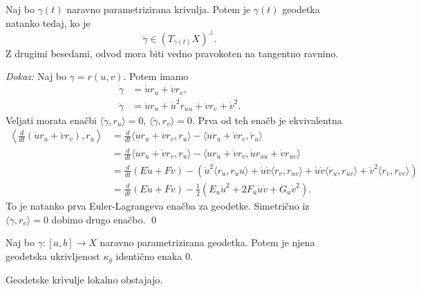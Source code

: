 \begin{izrek}
\label{izr_karakterizacija_geodetke_pri_naravni_parametrizaciji}
 Naj bo $\gamma(t)$ naravno parametrizirana krivulja. Potem je $\gamma(t)$ geodetka natanko tedaj, ko je \begin{equation*}
 \ddot{\gamma} \in (T_{\gamma(t)}X)^{\perp}.
 \end{equation*}  
Z drugimi besedami, odvod mora biti vedno pravokoten na tangentno ravnino.
\end{izrek}
\noindent
{\em Dokaz:\/}
Naj bo $\gamma = r(u,v)$. Potem imamo \begin{align*}
    \dot{\gamma} &= \dot{u} r_u + \dot{v} r_v ,\\
    \ddot{\gamma} &= \ddot{u} r_u + \dot{u}^2 r_{uu} + \ddot{v} r_v + \dot{v}^2.
\end{align*}
Veljati morata enačbi $\langle \ddot{\gamma}, r_u \rangle = 0$, $\langle \ddot{\gamma}, r_v \rangle  = 0$. Prva od teh enačb
je ekvivalentna \begin{align*}
    \left\langle \frac{d}{dt} (\dot{u} r_u + \dot{v} r_v), r_u \right\rangle  &= \frac{d}{dt}  \langle \dot{u} r_u + \dot{v} r_v, r_u \rangle - \langle \dot{u} r_u + \dot{v} r_v, \dot{r}_u \rangle \\
     &= \frac{d}{dt}  \langle \dot{u} r_u + \dot{v} r_v, r_u \rangle - \langle \dot{u} r_u + \dot{v} r_v, \dot{u} r_{uu} + \dot{v} r_{uv} \rangle \\
     &= \frac{d}{dt} (E \dot{u} + F\dot{v}) - (\dot{u}^2 \langle r_u, r_uu \rangle + \dot{u} \dot{v} \langle r_v, r_{uv} \rangle + \dot{u} \dot{v} \langle r_u, r_{uv} \rangle + \dot{v}^2 \langle r_v, r_{vv}  \rangle  ) \\
     &= \frac{d}{dt}   (E \dot{u} + F\dot{v}) - \frac{1}{2} (E_u \dot{u}^2 + 2 F_u \dot{u} \dot{v} + G_u \dot{v}^2).
    \end{align*}
To je natanko prva Euler-Lagrangeva enačba za geodetke. Simetrično iz $\langle \ddot{\gamma}, r_v \rangle  = 0$ dobimo drugo enačbo.
\qed

\begin{posledica}
\label{psl_geodetksa_ukrivljenost_naravno_parametrziranih_geodetk_je_0}
Naj bo $\gamma: [a,b] \to X$ naravno parametrizirana geodetka. Potem je njena geodetska ukrivljenost $\kappa_g$ identično enaka $0$.
\end{posledica}

\begin{trditev}
\label{trd_lokalni_obstoj_geodetk}
Geodetske krivulje lokalno obstajajo.
\end{trditev}

